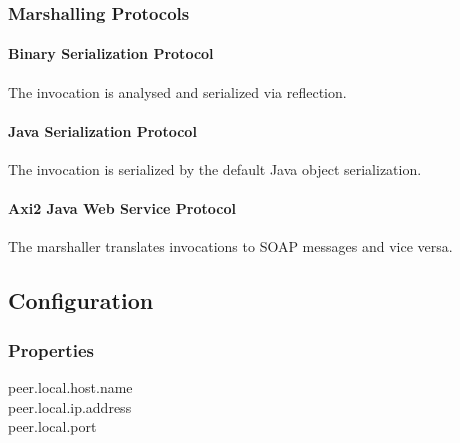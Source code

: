 \subsubsection{Marshalling Protocols}

\paragraph{Binary Serialization Protocol}

The invocation is analysed and serialized via reflection.

\paragraph{Java Serialization Protocol}

The invocation is serialized by the default Java object serialization.

\paragraph{Axi2 Java Web Service Protocol}

The marshaller translates invocations to SOAP messages and vice versa.

\subsection{Configuration}

\subsubsection{Properties}

peer.local.host.name\\
peer.local.ip.address\\
peer.local.port\\
